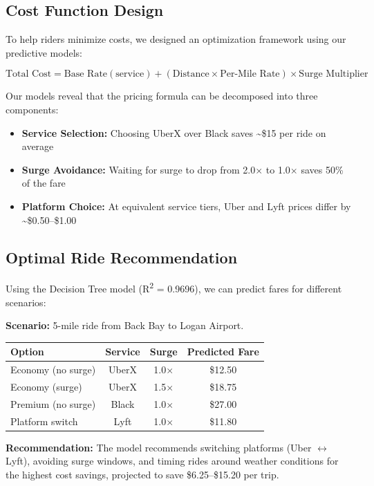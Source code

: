 \documentclass[12pt,a4paper]{article}
\begin{document}
\subsection{Cost Function Design}

To help riders minimize costs, we designed an optimization framework using our predictive models:

\[
\text{Total Cost} = \text{Base Rate}(\text{service}) + (\text{Distance} \times \text{Per-Mile Rate}) \times \text{Surge Multiplier}
\]

Our models reveal that the pricing formula can be decomposed into three components:
\begin{itemize}
    \item \textbf{Service Selection:} Choosing UberX over Black saves \textasciitilde\$15 per ride on average
    \item \textbf{Surge Avoidance:} Waiting for surge to drop from 2.0$\times$ to 1.0$\times$ saves 50\% of the fare
    \item \textbf{Platform Choice:} At equivalent service tiers, Uber and Lyft prices differ by \textasciitilde\$0.50--\$1.00
\end{itemize}

\subsection{Optimal Ride Recommendation}

Using the Decision Tree model (R\textsuperscript{2} = 0.9696), we can predict fares for different scenarios:

\textbf{Scenario:} 5-mile ride from Back Bay to Logan Airport.

\begin{table}[H]
\centering
\begin{tabular}{lccc}
\toprule
\textbf{Option} & \textbf{Service} & \textbf{Surge} & \textbf{Predicted Fare} \\
\midrule
Economy (no surge) & UberX & 1.0$\times$ & \$12.50 \\
Economy (surge) & UberX & 1.5$\times$ & \$18.75 \\
Premium (no surge) & Black & 1.0$\times$ & \$27.00 \\
Platform switch & Lyft & 1.0$\times$ & \$11.80 \\
\bottomrule
\end{tabular}
\end{table}

\textbf{Recommendation:} The model recommends switching platforms (Uber $\leftrightarrow$ Lyft), avoiding surge windows, and timing rides around weather conditions for the highest cost savings, projected to save \$6.25--\$15.20 per trip.
\end{document}
